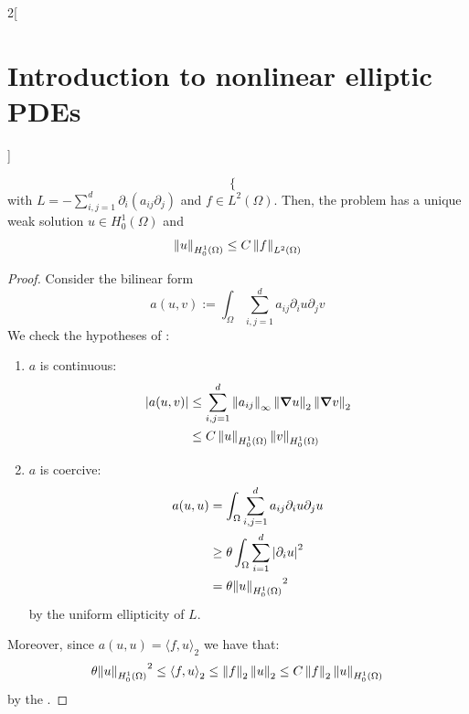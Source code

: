 \documentclass[../../../main_math.tex]{subfiles}
\begin{document}
\begin{multicols}{2}[\section{Introduction to nonlinear elliptic PDEs}]
\begin{proposition}
$$\begin{cases}
      \end{cases}
    $$
    with $L=-\sum_{i,j=1}^d\partial_i(a_{ij}\partial_j)$ and $f\in L^2(\Omega)$. Then, the problem has a unique weak solution $u\in H_0^1(\Omega)$ and
    $$
      \left\|u\right\|_{H_0^1(\Omega)}\leq C\left\|f\right\|_{L^2(\Omega)}
    $$
  \end{proposition}
  \begin{proof}
    Consider the bilinear form $$
      a(u,v):=\int_\Omega\sum_{i,j=1}^da_{ij}\partial_iu\partial_jv
    $$
    We check the hypotheses of :
    \begin{enumerate}
      \item $a$ is continuous:
            \begin{align*}
              \abs{a(u,v)} & \leq \sum_{i,j=1}^d\left\|a_{ij}\right\|_{\infty}\left\|\grad u\right\|_{2}\left\|\grad v\right\|_{2} \\
                           & \leq C\left\|u\right\|_{H_0^1(\Omega)}\left\|v\right\|_{H_0^1(\Omega)}
            \end{align*}
      \item $a$ is coercive:
            \begin{align*}
              a(u,u) & =\int_\Omega\sum_{i,j=1}^da_{ij}\partial_iu\partial_ju   \\
                     & \geq \theta \int_\Omega\sum_{i=1}^d{\abs{\partial_iu}}^2 \\
                     & =\theta {\left\|u\right\|_{H_0^1(\Omega)}}^2
            \end{align*}
            by the uniform ellipticity of $L$.
    \end{enumerate}
    Moreover, since $ a(u,u)={\langle f,u\rangle}_2$ we have that:
    \begin{align*}
      \theta {\left\|u\right\|_{H_0^1(\Omega)}}^2\leq {\langle f,u\rangle}_2\leq \left\|f\right\|_2\left\|u\right\|_{2}\leq C \left\|f\right\|_2\left\|u\right\|_{H_0^1(\Omega)}
    \end{align*}
    by the .
  \end{proof}

\end{multicols}
\end{document}
